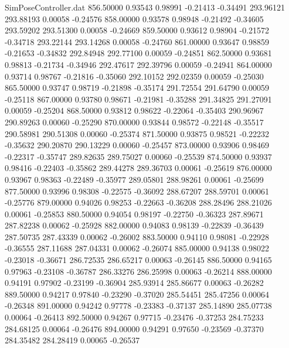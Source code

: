 \begin{filecontents}{SimPoseController.dat}
 856.50000    0.93543    0.98991    -0.21413   -0.34491  293.96121  293.88193    0.00058   -0.24576
 858.00000    0.93578    0.98948    -0.21492   -0.34605  293.59202  293.51300    0.00058   -0.24669
 859.50000    0.93612    0.98904    -0.21572   -0.34718  293.22144  293.14268    0.00058   -0.24760
 861.00000    0.93647    0.98859    -0.21653   -0.34832  292.84948  292.77100    0.00059   -0.24851
 862.50000    0.93681    0.98813    -0.21734   -0.34946  292.47617  292.39796    0.00059   -0.24941
 864.00000    0.93714    0.98767    -0.21816   -0.35060  292.10152  292.02359    0.00059   -0.25030
 865.50000    0.93747    0.98719    -0.21898   -0.35174  291.72554  291.64790    0.00059   -0.25118
 867.00000    0.93780    0.98671    -0.21981   -0.35288  291.34825  291.27091    0.00059   -0.25204
 868.50000    0.93812    0.98622    -0.22064   -0.35403  290.96967  290.89263    0.00060   -0.25290
 870.00000    0.93844    0.98572    -0.22148   -0.35517  290.58981  290.51308    0.00060   -0.25374
 871.50000    0.93875    0.98521    -0.22232   -0.35632  290.20870  290.13229    0.00060   -0.25457
 873.00000    0.93906    0.98469    -0.22317   -0.35747  289.82635  289.75027    0.00060   -0.25539
 874.50000    0.93937    0.98416    -0.22403   -0.35862  289.44278  289.36703    0.00061   -0.25619
 876.00000    0.93967    0.98363    -0.22489   -0.35977  289.05801  288.98261    0.00061   -0.25699
 877.50000    0.93996    0.98308    -0.22575   -0.36092  288.67207  288.59701    0.00061   -0.25776
 879.00000    0.94026    0.98253    -0.22663   -0.36208  288.28496  288.21026    0.00061   -0.25853
 880.50000    0.94054    0.98197    -0.22750   -0.36323  287.89671  287.82238    0.00062   -0.25928
 882.00000    0.94083    0.98139    -0.22839   -0.36439  287.50735  287.43339    0.00062   -0.26002
 883.50000    0.94110    0.98081    -0.22928   -0.36555  287.11688  287.04331    0.00062   -0.26074
 885.00000    0.94138    0.98022    -0.23018   -0.36671  286.72535  286.65217    0.00063   -0.26145
 886.50000    0.94165    0.97963    -0.23108   -0.36787  286.33276  286.25998    0.00063   -0.26214
 888.00000    0.94191    0.97902    -0.23199   -0.36904  285.93914  285.86677    0.00063   -0.26282
 889.50000    0.94217    0.97840    -0.23290   -0.37020  285.54451  285.47256    0.00064   -0.26348
 891.00000    0.94242    0.97778    -0.23383   -0.37137  285.14890  285.07738    0.00064   -0.26413
 892.50000    0.94267    0.97715    -0.23476   -0.37253  284.75233  284.68125    0.00064   -0.26476
 894.00000    0.94291    0.97650    -0.23569   -0.37370  284.35482  284.28419    0.00065   -0.26537

\end{filecontents}
